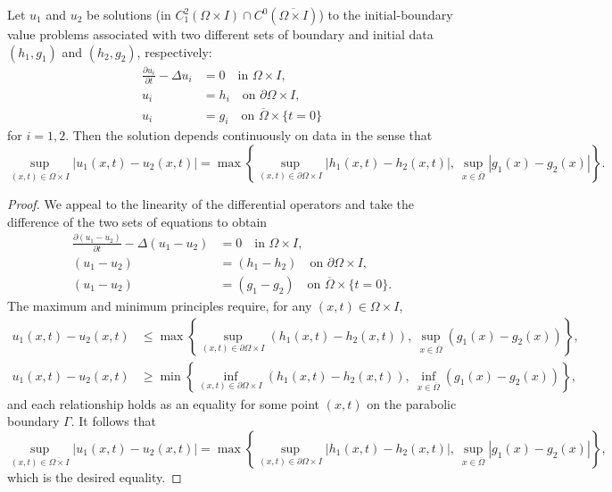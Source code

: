 \begin{theorem}
    Let $u_1$ and $u_2$ be solutions (in $C_1^2(\Omega \times I) \cap C^0(\overline{\Omega \times I})$) to the initial-boundary value problems associated with two different sets of boundary and initial data $(h_1, g_1)$ and $(h_2, g_2)$, respectively:
    \begin{align*}
        \frac{\partial u_i}{\partial t} - \Delta u_i &= 0 \quad \text{in } \Omega \times I, \\
        u_i &= h_i \quad \text{on } \partial\Omega \times I, \\
        u_i &= g_i \quad \text{on } \overline{\Omega} \times \{t = 0\}
    \end{align*}
    for $i = 1, 2$. Then the solution depends continuously on data in the sense that
    \begin{equation*}
        \sup_{(x,t) \in \overline{\Omega \times I}} |u_1(x, t) - u_2(x, t)| = \max\left\{\sup_{(x,t) \in \partial\Omega \times I} |h_1(x, t) - h_2(x, t)|, \ \sup_{x \in \overline{\Omega}} |g_1(x) - g_2(x)|\right\}. \tag{5.5}
    \end{equation*}
\end{theorem}
\begin{proof}
    We appeal to the linearity of the differential operators and take the difference of the two sets of equations to obtain
    \begin{align*}
        \frac{\partial(u_1 - u_2)}{\partial t} - \Delta(u_1 - u_2) &= 0 \quad \text{in } \Omega \times I, \\
        (u_1 - u_2) &= (h_1 - h_2) \quad \text{on } \partial\Omega \times I, \\
        (u_1 - u_2) &= (g_1 - g_2) \quad \text{on } \overline{\Omega} \times \{t = 0\}.
    \end{align*}
    The maximum and minimum principles require, for any $(x, t) \in \Omega \times I$,
    \begin{align*}
        u_1(x, t) - u_2(x, t) &\leq \max\left\{\sup_{(x,t) \in \partial\Omega \times I} (h_1(x, t) - h_2(x, t)), \ \sup_{x \in \overline{\Omega}} (g_1(x) - g_2(x))\right\}, \\
        u_1(x, t) - u_2(x, t) &\geq \min\left\{\inf_{(x,t) \in \partial\Omega \times I} (h_1(x, t) - h_2(x, t)), \ \inf_{x \in \overline{\Omega}} (g_1(x) - g_2(x))\right\},
    \end{align*}
    and each relationship holds as an equality for some point $(x, t)$ on the parabolic boundary $\Gamma$. It follows that
    \[\sup_{(x,t) \in \overline{\Omega \times I}} |u_1(x, t) - u_2(x, t)| = \max\left\{\sup_{(x,t) \in \partial\Omega \times I} |h_1(x, t) - h_2(x, t)|, \ \sup_{x \in \overline{\Omega}} |g_1(x) - g_2(x)|\right\},\]
    which is the desired equality.
\end{proof}

